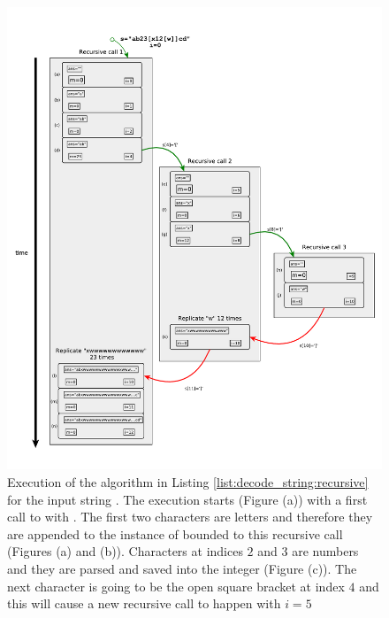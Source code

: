 


\begin{figure}
	\captionsetup{font=footnotesize,labelfont=footnotesize}
	\centering
	\includegraphics[width=\textwidth]{sources/decode_string/images/recursion}
   \caption{Execution of the algorithm in Listing \ref{list:decode_string:recursive} for the input
	string . The execution starts (Figure (a)) with a first call to
	 with . The first two characters are letters
	and therefore they are appended to the instance of  bounded to this recursive call
	(Figures (a) and (b)). Characters at indices $2$ and $3$ are numbers and they are parsed and
	saved into the integer  (Figure (c)). The next character is going to be the open
	square bracket at index $4$  and this will cause a new recursive call to happen with $i=5$
}
\end{figure}
